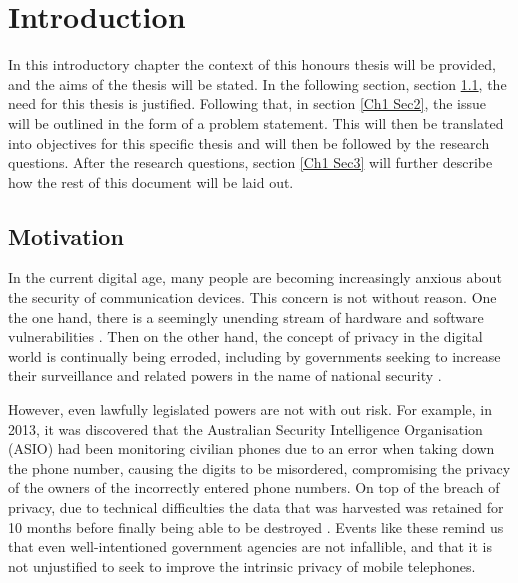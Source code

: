 
\chapter{Introduction} %

\label{Chapter 1} %

In this introductory chapter the context of this honours thesis will be provided, and the aims of the thesis will be stated.
In the following section, section \ref{Ch1 Sec1}, the need for this thesis is justified.
Following that, in section \ref{Ch1 Sec2}, the issue will be outlined in the form of a problem statement.
This will then be translated into objectives for this specific thesis and will then be followed by the research questions.
After the research questions, section \ref{Ch1 Sec3} will further describe how the rest of this document will be laid out.   


\section{Motivation}

\label{Ch1 Sec1}

In the current digital age, many people are becoming increasingly anxious about the security of communication devices.
This concern is not without reason. One the one hand, there is a seemingly unending stream of hardware and software vulnerabilities \cite{WannaCry}\cite{SpecMel}.
Then on the other hand, the concept of privacy in the digital world is continually being erroded, including by governments seeking to increase their surveillance and related powers in the name of national security \cite{Reference37}.

However, even lawfully legislated powers are not with out risk.  For example, in 2013, it was discovered that the Australian Security Intelligence Organisation (ASIO) had been monitoring civilian phones due to an error when taking down the phone number, causing the digits to be misordered, compromising the privacy of the owners of the incorrectly entered phone numbers.
On top of the breach of privacy, due to technical difficulties the data that was harvested was retained for 10 months before finally being able to be destroyed \cite{Reference36}.
Events like these remind us that even well-intentioned government agencies are not infallible, and that it is not unjustified to seek to improve the intrinsic privacy of mobile telephones.

